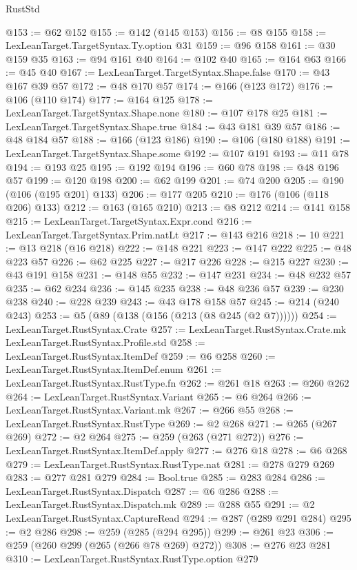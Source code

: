 \begin{lexlean}{RustStd}
\begin{coremodule}
@153 := @62 @152
@155 := @142 (@145 @153)
@156 := @8 @155
@158 := LexLeanTarget.TargetSyntax.Ty.option @31
@159 := @96 @158
@161 := @30 @159 @35
@163 := @94 @161 @40
@164 := @102 @40
@165 := @164 @63
@166 := @45 @40
@167 := LexLeanTarget.TargetSyntax.Shape.false
@170 := @43 @167 @39 @57
@172 := @48 @170 @57
@174 := @166 (@123 @172)
@176 := @106 (@110 @174)
@177 := @164 @125
@178 := LexLeanTarget.TargetSyntax.Shape.none
@180 := @107 @178 @25
@181 := LexLeanTarget.TargetSyntax.Shape.true
@184 := @43 @181 @39 @57
@186 := @48 @184 @57
@188 := @166 (@123 @186)
@190 := @106 (@180 @188)
@191 := LexLeanTarget.TargetSyntax.Shape.some
@192 := @107 @191
@193 := @11 @78
@194 := @193 @25
@195 := @192 @194
@196 := @60 @78
@198 := @48 @196 @57
@199 := @120 @198
@200 := @62 @199
@201 := @74 @200
@205 := @190 (@106 (@195 @201) @133)
@206 := @177 @205
@210 := @176 (@106 (@118 @206) @133)
@212 := @163 (@165 @210)
@213 := @8 @212
@214 := @141 @158
@215 := LexLeanTarget.TargetSyntax.Expr.cond
@216 := LexLeanTarget.TargetSyntax.Prim.natLt
@217 := @143 @216
@218 := 10
@221 := @13 @218 (@16 @218)
@222 := @148 @221
@223 := @147 @222
@225 := @48 @223 @57
@226 := @62 @225
@227 := @217 @226
@228 := @215 @227
@230 := @43 @191 @158
@231 := @148 @55
@232 := @147 @231
@234 := @48 @232 @57
@235 := @62 @234
@236 := @145 @235
@238 := @48 @236 @57
@239 := @230 @238
@240 := @228 @239
@243 := @43 @178 @158 @57
@245 := @214 (@240 @243)
@253 := @5 (@89 (@138 (@156 (@213 (@8 @245 (@2 @7))))))
@254 := LexLeanTarget.RustSyntax.Crate
@257 := LexLeanTarget.RustSyntax.Crate.mk LexLeanTarget.RustSyntax.Profile.std
@258 := LexLeanTarget.RustSyntax.ItemDef
@259 := @6 @258
@260 := LexLeanTarget.RustSyntax.ItemDef.enum
@261 := LexLeanTarget.RustSyntax.RustType.fn
@262 := @261 @18
@263 := @260 @262
@264 := LexLeanTarget.RustSyntax.Variant
@265 := @6 @264
@266 := LexLeanTarget.RustSyntax.Variant.mk
@267 := @266 @55
@268 := LexLeanTarget.RustSyntax.RustType
@269 := @2 @268
@271 := @265 (@267 @269)
@272 := @2 @264
@275 := @259 (@263 (@271 @272))
@276 := LexLeanTarget.RustSyntax.ItemDef.apply
@277 := @276 @18
@278 := @6 @268
@279 := LexLeanTarget.RustSyntax.RustType.nat
@281 := @278 @279 @269
@283 := @277 @281 @279
@284 := Bool.true
@285 := @283 @284
@286 := LexLeanTarget.RustSyntax.Dispatch
@287 := @6 @286
@288 := LexLeanTarget.RustSyntax.Dispatch.mk
@289 := @288 @55
@291 := @2 LexLeanTarget.RustSyntax.CaptureRead
@294 := @287 (@289 @291 @284)
@295 := @2 @286
@298 := @259 (@285 (@294 @295))
@299 := @261 @23
@306 := @259 (@260 @299 (@265 (@266 @78 @269) @272))
@308 := @276 @23 @281
@310 := LexLeanTarget.RustSyntax.RustType.option @279

\end{coremodule}
\end{lexlean}
